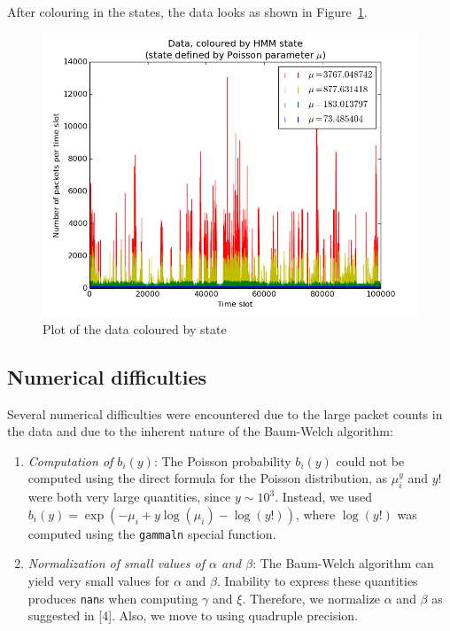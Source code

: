 \documentclass[11pt, twoside]{article}
\begin{document}
After colouring in the states, the data looks as shown in Figure~\ref{fig:data-with-states}.
\begin{figure}[h!]
	\centering
	\includegraphics[scale = 0.7]{data-with-states}
	\caption{Plot of the data coloured by state}
	\label{fig:data-with-states}
\end{figure}

\subsection{Numerical difficulties}

Several numerical difficulties were encountered due to the large packet counts in the data and due to the inherent nature of the Baum-Welch algorithm:
\begin{enumerate}
	\item \emph{Computation of $b_i(y)$}: The Poisson probability $b_i(y)$ could not be computed using the direct formula for the Poisson distribution, as $\mu_i^y$ and $y!$ were both very large quantities, since $y \sim 10^3$. Instead, we used $b_i(y) = \exp( -\mu_i + y \log(\mu_i) - \log(y!) )$, where $\log(y!)$ was computed using the \verb+gammaln+ special function.
	\item \emph{Normalization of small values of $\alpha$ and $\beta$}: The Baum-Welch algorithm can yield very small values for $\alpha$ and $\beta$. Inability to express these quantities produces \verb+nan+s when computing $\gamma$ and $\xi$. Therefore, we normalize $\alpha$ and $\beta$ as suggested in [4]. Also, we move to using quadruple precision.
\end{enumerate}
\end{document}
